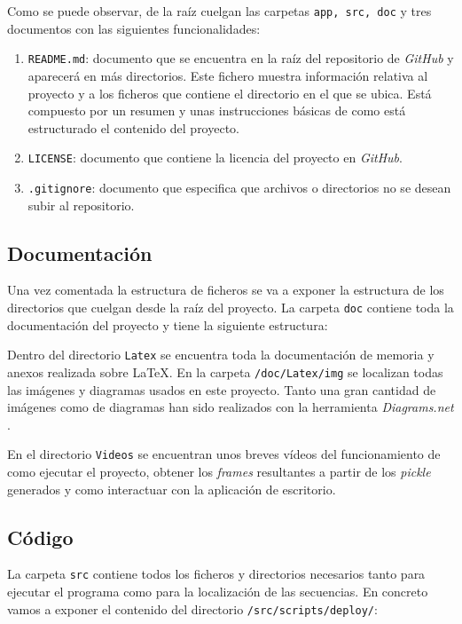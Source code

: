 Como se puede observar, de la raíz cuelgan las carpetas \texttt{app, src, doc} y tres documentos con las siguientes funcionalidades:
\begin{enumerate}
    \item \texttt{README.md}: documento que se encuentra en la raíz del repositorio de \textit{GitHub} y aparecerá en más directorios. Este fichero muestra información relativa al proyecto y a los ficheros que contiene el directorio en el que se ubica. Está compuesto por un resumen y unas instrucciones básicas de como está estructurado el contenido del proyecto.
    \item \texttt{LICENSE}: documento que contiene la licencia del proyecto en \textit{GitHub}.
    \item \texttt{.gitignore}: documento que especifica que archivos o directorios no se desean subir al repositorio. 
\end{enumerate}

\subsection{Documentación}
Una vez comentada la estructura de ficheros se va a exponer la estructura de los directorios que cuelgan desde la raíz del proyecto. La carpeta \texttt{doc} contiene toda la documentación del proyecto y tiene la siguiente estructura:

Dentro del directorio \texttt{Latex} se encuentra toda la documentación de memoria y anexos realizada sobre \LaTeX. En la carpeta \texttt{/doc/Latex/img} se localizan todas las imágenes y diagramas usados en este proyecto. Tanto una gran cantidad de imágenes como de diagramas han sido realizados con la herramienta \textit{Diagrams.net} \cite{wiki:drawio}. 

En el directorio \texttt{Videos} se encuentran unos breves vídeos del funcionamiento de como ejecutar el proyecto, obtener los \textit{frames} resultantes a partir de los \textit{pickle} generados y como interactuar con la aplicación de escritorio. 

\newpage
\subsection{Código}
La carpeta \texttt{src} contiene todos los ficheros y directorios necesarios tanto para ejecutar el programa como para la localización de las secuencias. En concreto vamos a exponer el contenido del directorio \texttt{/src/scripts/deploy/}:

